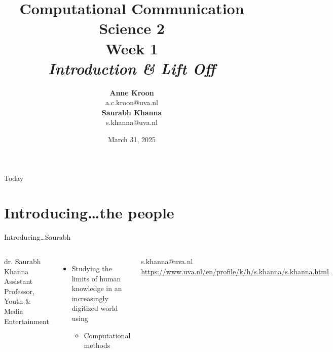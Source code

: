 \documentclass[handout]{beamer}
\title[Computational Communication Science 2]{\textbf{Computational Communication Science 2} \\[0.3cm] 
\large{Week 1}\\[0.2cm]
\emph{Introduction \& Lift Off}}
\author[Anne Kroon, Saurabh Khanna]{\textbf{Anne Kroon} \\ \footnotesize{a.c.kroon@uva.nl} \\[0.2cm] 
\textbf{Saurabh Khanna} \\ \footnotesize{s.khanna@uva.nl}}
\date[\today]{March 31, 2025}
\institute[Digital Society Minor, UvA]{\small Digital Society Minor \\ University of Amsterdam}
\begin{document}
\begin{frame}{}
	\titlepage
\end{frame}
	
\begin{frame}{Today}
	\tableofcontents
\end{frame}

\section[The people]{Introducing\ldots the people}

\begin{frame}{Introducing\ldots \huge{Saurabh}} 
	\begin{columns}
		dr. Saurabh Khanna \\
		Assistant Professor, Youth \& Media Entertainment 
		\begin{itemize}
			\item Studying the limits of human knowledge in an increasingly digitized world using
			\begin{itemize}
				\item Computational methods 
			\end{itemize}
		\end{itemize}
		\textbar s.khanna@uva.nl \textbar \url{https://www.uva.nl/en/profile/k/h/s.khanna/s.khanna.html} 
	\end{columns}
\end{frame}
\end{document}
